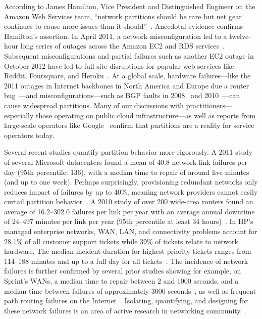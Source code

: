 According to James Hamilton, Vice President and Distinguished Engineer
on the Amazon Web Services team, ``network partitions should be rare
but net gear continues to cause more issues than it
should''~\cite{hamilton-partitions}. Anecdotal evidence confirms
Hamilton's assertion. In April 2011, a network misconfiguration led to
a twelve-hour long series of outages across the Amazon EC2 and RDS
services~\cite{amazon-netpartition}. Subsequent misconfigurations and
partial failures such as another EC2 outage in October 2012 have led
to full site disruptions for popular web services like Reddit,
Foursquare, and Heroku~\cite{ec2-downsites}. At a global scale,
hardware failures---like the 2011 outages in Internet backbones in
North America and Europe due a router
bug~\cite{juniper-partition}---and misconfigurations---such as BGP
faults in 2008~\cite{pakistan-youtube} and
2010~\cite{research-experiment-partition}---can cause widespread
partitions. Many of our discussions with practitioners---especially
those operating on public cloud infrastructure---as well as reports
from large-scale operators like Google~\cite{dean-keynote} confirm
that partitions are a reality for service operators today.

Several recent studies quantify partition behavior more rigorously. A
2011 study of several Microsoft datacenters found a mean of 40.8
network link failures per day (95th percentile: 136), with a median
time to repair of around five minutes (and up to one week). Perhaps
surprisingly, provisioning redundant networks only reduces impact of
failures by up to 40\%, meaning network providers cannot easily
curtail partition behavior~\cite{sigcomm-dc}. A 2010 study of over 200
wide-area routers found an average of 16.2--302.0 failures per link
per year with an average annual downtime of 24--497 minutes per link
per year (95th percentile at least 34 hours)~\cite{sigcomm-wan}. In
HP's managed enterprise networks, WAN, LAN, and connectivity problems
account for 28.1\% of all customer support tickets while 39\% of
tickets relate to network hardware.  The median incident duration for
highest priority tickets ranges from 114--188 minutes and up to a full
day for all tickets~\cite{turner2012failure}. The incidence of network
failures is further confirmed by several prior studies showing for
example, on Sprint's WANs, a median time to repair between 2 and 1000
seconds, and a median time between failures of approximately 3000
seconds~\cite{ip-backbone-failures}, as well as frequent path routing
failures on the Internet~\cite{labovitz-failures}. Isolating,
quantifying, and designing for these network failures is an area of active
research in networking community~\cite{surviving-failures-bodik,
  uw-failure-networks}.

